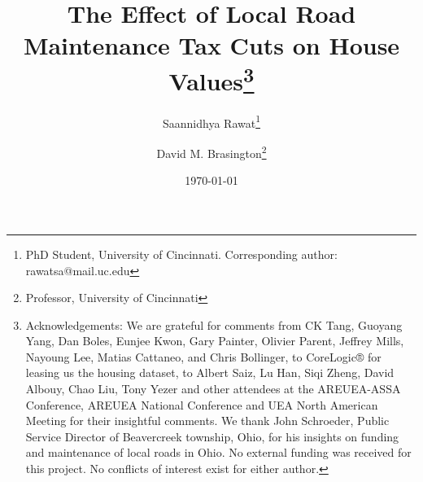 \documentclass[12pt]{article}
\begin{document}
\begin{titlepage}
\title{The Effect of Local Road Maintenance Tax Cuts on House Values\thanks{Acknowledgements: We are grateful for comments from CK Tang, Guoyang Yang, Dan Boles, Eunjee Kwon, Gary Painter, Olivier Parent, Jeffrey Mills, Nayoung Lee, Matias Cattaneo, and Chris Bollinger, to CoreLogic® for leasing us the housing dataset, to Albert Saiz, Lu Han, Siqi Zheng, David Albouy, Chao Liu, Tony Yezer and other attendees at the AREUEA-ASSA Conference, AREUEA National Conference and UEA North American Meeting for their insightful comments. We thank John Schroeder, Public Service Director of Beavercreek township, Ohio, for his insights on funding and maintenance of local roads in Ohio. No external funding was received for this project. No conflicts of interest exist for either author.}}
\author{Saannidhya Rawat\thanks{PhD Student, University of Cincinnati. Corresponding author: rawatsa@mail.uc.edu}  \and David M. Brasington\thanks{Professor, University of Cincinnati}}
\date{\today} 
\maketitle
 


\end{titlepage}
\end{document}
